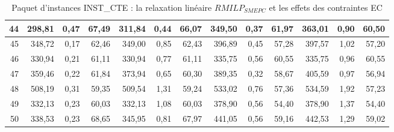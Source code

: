 {\begin{table}[H]
\begin{tabular}{|r|rrr|rrr|rrr|rrr|}
		44	&	298,81	&	0,47	&	67,49	&	311,84	&	0,44	&	66,07	&	349,50	&	0,37	&	61,97	&	363,01	&	0,90	&	60,50	\\ \hline
		45	&	348,72	&	0,17	&	62,46	&	349,00	&	0,85	&	62,43	&	396,89	&	0,45	&	57,28	&	397,57	&	1,02	&	57,20	\\ \hline
		46	&	330,94	&	0,21	&	61,11	&	330,94	&	0,77	&	61,11	&	335,75	&	0,56	&	60,55	&	335,75	&	0,96	&	60,55	\\ \hline
		47	&	359,46	&	0,22	&	61,84	&	373,94	&	0,65	&	60,30	&	389,35	&	0,32	&	58,67	&	405,59	&	0,97	&	56,94	\\ \hline
		48	&	508,19	&	0,31	&	59,35	&	509,54	&	1,31	&	59,24	&	533,02	&	0,76	&	57,36	&	534,59	&	1,92	&	57,23	\\ \hline
		49	&	332,13	&	0,23	&	60,03	&	332,13	&	1,08	&	60,03	&	378,90	&	0,56	&	54,40	&	378,90	&	1,37	&	54,40	\\ \hline
		50	&	338,53	&	0,23	&	68,65	&	345,95	&	0,81	&	67,97	&	441,05	&	0,56	&	59,16	&	442,53	&	1,29	&	59,02	\\ \hline
		
		
		\bottomrule
	\end{tabular}%
	\caption[Impact des contraintes EC sur les résultats de \textit{$RMILP_{SMEPC}$} sur INST\_CTE]{Paquet d'instances INST\_CTE : la relaxation linéaire \textit{$RMILP_{SMEPC}$} et les effets des contraintes EC}
	\label{tab:frac4}%
\end{table}%
	
}
